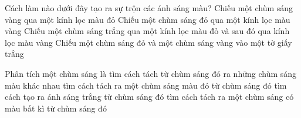 \begin{ex}
	Cách làm nào dưới đây tạo ra sự trộn các ánh sáng màu?
	\choice
	{Chiếu một chùm sáng vàng qua một kính lọc màu đỏ}
	{Chiếu một chùm sáng đỏ qua một kính lọc màu vàng}
	{Chiếu một chùm sáng trắng qua một kính lọc màu đỏ và sau đó qua kính lọc màu vàng}
	{\True Chiếu một chùm sáng đỏ và một chùm sáng vàng vào một tờ giấy trắng}
	\loigiai{}
\end{ex}

\begin{ex}
	Phân tích một chùm sáng là
	\choice
	{\True tìm cách tách từ chùm sáng đó ra những chùm sáng màu khác nhau}
	{tìm cách tách ra một chùm sáng màu đỏ từ chùm sáng đó}
	{tìm cách tạo ra ánh sáng trắng từ chùm sáng đó}
	{tìm cách tách ra một chùm sáng có màu bất kì từ chùm sáng đó}
	\loigiai{}
\end{ex}


